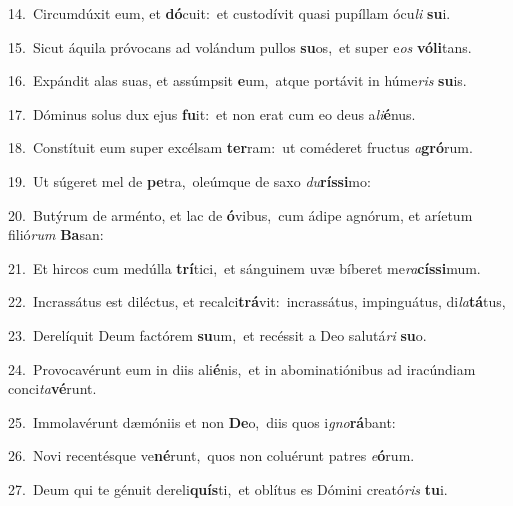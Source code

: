 {\numbfont\textcolor{\numbcolor}{14.}}~Circumdúxit eum, et \textbf{dó}\-cuit:~\star et custodívit quasi pupíllam ócu\textit{li} \textbf{su}\-i.\par
{\numbfont\textcolor{\numbcolor}{15.}}~Sicut áquila próvocans ad volándum pullos \textbf{su}\-os,~\star et super e\textit{os} \textbf{vó}\-\textbf{li}tans.\par
{\numbfont\textcolor{\numbcolor}{16.}}~Expándit alas suas, et assúmpsit \textbf{e}\-um,~\star atque portávit in húme\textit{ris} \textbf{su}\-is.\par
{\numbfont\textcolor{\numbcolor}{17.}}~Dóminus solus dux ejus \textbf{fu}\-it:~\star et non erat cum eo deus a\-\textit{li}\-\textbf{é}nus.\par
{\numbfont\textcolor{\numbcolor}{18.}}~Constítuit eum super excélsam \textbf{ter}\-ram:~\star ut coméderet fructus \textit{a}\-\textbf{gró}rum.\par
{\numbfont\textcolor{\numbcolor}{19.}}~Ut súgeret mel de \textbf{pe}\-tra,~\star oleúmque de saxo \textit{du}\-\textbf{rís}\textbf{si}mo:\par
{\numbfont\textcolor{\numbcolor}{20.}}~Butýrum de arménto, et lac de \textbf{ó}\-vibus,~\star cum ádipe agnórum, et aríetum filió\textit{rum} \textbf{Ba}\-san:\par
{\numbfont\textcolor{\numbcolor}{21.}}~Et hircos cum medúlla \textbf{trí}\-tici,~\star et sánguinem uvæ bíberet me\-\textit{ra}\-\textbf{cís}\textbf{si}mum.\par
{\numbfont\textcolor{\numbcolor}{22.}}~Incrassátus est diléctus, et recalci\-\textbf{trá}\-vit:~\star incrassátus, impinguátus, di\-\textit{la}\-\textbf{tá}tus,\par
{\numbfont\textcolor{\numbcolor}{23.}}~Derelíquit Deum factórem \textbf{su}\-um,~\star et recéssit a Deo salutá\textit{ri} \textbf{su}\-o.\par
{\numbfont\textcolor{\numbcolor}{24.}}~Provocavérunt eum in diis ali\-\textbf{é}\-nis,~\star et in abominatiónibus ad iracúndiam conci\-\textit{ta}\-\textbf{vé}runt.\par
{\numbfont\textcolor{\numbcolor}{25.}}~Immolavérunt dæmóniis et non \textbf{De}\-o,~\star diis quos i\-\textit{gno}\-\textbf{rá}bant:\par
{\numbfont\textcolor{\numbcolor}{26.}}~Novi recentésque ve\-\textbf{né}\-runt,~\star quos non coluérunt patres \textit{e}\-\textbf{ó}rum.\par
{\numbfont\textcolor{\numbcolor}{27.}}~Deum qui te génuit dereli\-\textbf{quís}\-ti,~\star et oblítus es Dómini creató\textit{ris} \textbf{tu}\-i.\par
